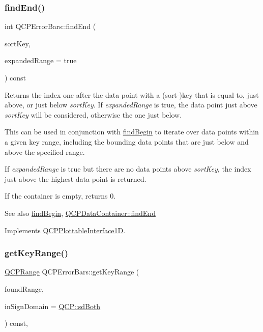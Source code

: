 \subsubsection{\texorpdfstring{find\+End()}{findEnd()}}
{\footnotesize\ttfamily int Q\+C\+P\+Error\+Bars\+::find\+End (\begin{DoxyParamCaption}\item[{double}]{sort\+Key,  }\item[{bool}]{expanded\+Range = {\ttfamily true} }\end{DoxyParamCaption}) const\hspace{0.3cm}{\ttfamily [virtual]}}

Returns the index one after the data point with a (sort-\/)key that is equal to, just above, or just below {\itshape sort\+Key}. If {\itshape expanded\+Range} is true, the data point just above {\itshape sort\+Key} will be considered, otherwise the one just below.

This can be used in conjunction with \hyperlink{class_q_c_p_error_bars_a5c74b510f1d7254263ec18cd3a359a07}{find\+Begin} to iterate over data points within a given key range, including the bounding data points that are just below and above the specified range.

If {\itshape expanded\+Range} is true but there are no data points above {\itshape sort\+Key}, the index just above the highest data point is returned.

If the container is empty, returns 0.

\begin{DoxySeeAlso}{See also}
\hyperlink{class_q_c_p_error_bars_a5c74b510f1d7254263ec18cd3a359a07}{find\+Begin}, \hyperlink{class_q_c_p_data_container_afb8b8f23cc2b7234a793a25ce79fe48f}{Q\+C\+P\+Data\+Container\+::find\+End} 
\end{DoxySeeAlso}


Implements \hyperlink{class_q_c_p_plottable_interface1_d_a5deced1016bc55a41a2339619045b295}{Q\+C\+P\+Plottable\+Interface1D}.

\mbox{\label{class_q_c_p_error_bars_a6cac828a430d66ac77a167549d01d212}} 
\subsubsection{\texorpdfstring{get\+Key\+Range()}{getKeyRange()}}
{\footnotesize\ttfamily \hyperlink{class_q_c_p_range}{Q\+C\+P\+Range} Q\+C\+P\+Error\+Bars\+::get\+Key\+Range (\begin{DoxyParamCaption}\item[{bool \&}]{found\+Range,  }\item[{\hyperlink{namespace_q_c_p_afd50e7cf431af385614987d8553ff8a9}{Q\+C\+P\+::\+Sign\+Domain}}]{in\+Sign\+Domain = {\ttfamily \hyperlink{namespace_q_c_p_afd50e7cf431af385614987d8553ff8a9aa38352ef02d51ddfa4399d9551566e24}{Q\+C\+P\+::sd\+Both}} }\end{DoxyParamCaption}) const\hspace{0.3cm}{\ttfamily [protected]}, {\ttfamily [virtual]}}

